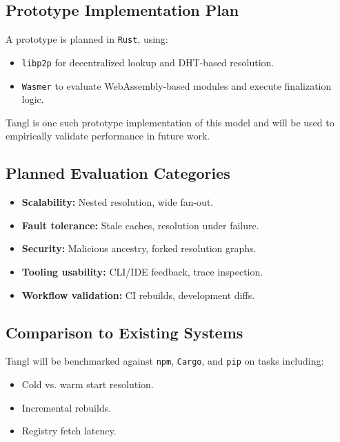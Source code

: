 \documentclass[sigplan,screen]{acmart}
\begin{document}
\subsection{Prototype Implementation Plan}

A prototype is planned in \texttt{Rust}, using:

\begin{itemize}
  \item \texttt{libp2p} for decentralized lookup and DHT-based resolution.
  \item \texttt{Wasmer} to evaluate WebAssembly-based modules and execute finalization logic.
\end{itemize}

Tangl is one such prototype implementation of this model and will be used to empirically validate performance in future work.

\subsection{Planned Evaluation Categories}

\begin{itemize}
  \item \textbf{Scalability:} Nested resolution, wide fan-out.
  \item \textbf{Fault tolerance:} Stale caches, resolution under failure.
  \item \textbf{Security:} Malicious ancestry, forked resolution graphs.
  \item \textbf{Tooling usability:} CLI/IDE feedback, trace inspection.
  \item \textbf{Workflow validation:} CI rebuilds, development diffs.
\end{itemize}

\subsection{Comparison to Existing Systems}

Tangl will be benchmarked against \texttt{npm}, \texttt{Cargo}, and \texttt{pip} on tasks including:

\begin{itemize}
  \item Cold vs. warm start resolution.
  \item Incremental rebuilds.
  \item Registry fetch latency.
\end{itemize}
\end{document}
